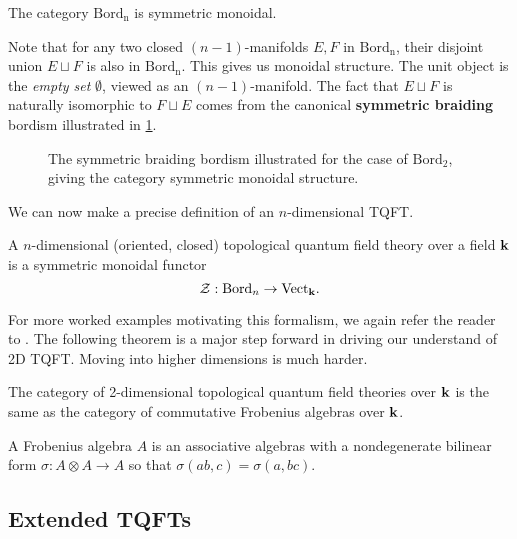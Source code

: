 	\begin{obs}
		The category $\mathrm{Bord_n}$ is symmetric monoidal.
	\end{obs}
	Note that for any two closed $(n-1)$-manifolds $E, F$ in $\mathrm{Bord_n}$, their disjoint union $E \sqcup F$ is also in $\mathrm{Bord_n}$. This gives us monoidal structure. The unit object is the \emph{empty set} $\emptyset$, viewed as an $(n-1)$-manifold. The fact that $E \sqcup F$ is naturally isomorphic to $F \sqcup E$ comes from the canonical \textbf{symmetric braiding} bordism illustrated in \ref{fig:tqft2}.
	
	
	\begin{figure}
		\centering
{}
	\caption{The symmetric braiding bordism illustrated for the case of $\mathrm{Bord}_2$, giving the category symmetric monoidal structure.}
	\label{fig:tqft2}
	\end{figure}
	
	We can now make a precise definition of an $n$-dimensional TQFT. 
	\begin{defn}[TQFT]
		 A $n$-dimensional (oriented, closed) topological quantum field theory over a field $\mathbf{k}$ is a symmetric monoidal functor
		 \[
		 	\mathcal{Z}: \mathrm{Bord}_n \to \mathrm{Vect}_{\mathbf{k}}.
		 \]
	\end{defn}
	
	For more worked examples motivating this formalism, we again refer the reader to \cite{carqueville2017}. The following theorem is a major step forward in driving our understand of 2D TQFT. Moving into higher dimensions is much harder. 
	
	\begin{theorem}
		The category of 2-dimensional topological quantum field theories over $\mathbf{k}$ is the same as the category of commutative Frobenius algebras over $\mathbf{k}$.
	\end{theorem}
	A Frobenius algebra $A$ is an associative algebras with a nondegenerate bilinear form $\sigma: A \otimes A \to A$ so that $\sigma(a b, c) = \sigma(a, bc)$.
	
	\subsection{Extended TQFTs} %
	\label{sub:extended_tqfts}
		
